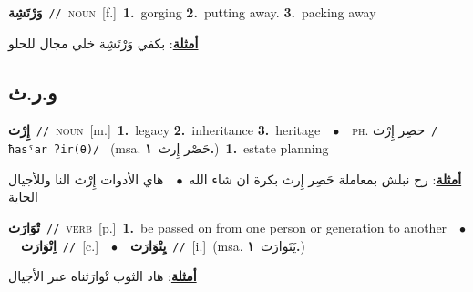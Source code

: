 \documentclass[10pt,a4paper,twoside]{article} %
\begin{document}
\begin{multicols}{2}
{\setlength\topsep{0pt}\textbf{\foreignlanguage{arabic}{وَرْتَشِة}}\ {\color{gray}\texttt{//}\color{black}}\ \textsc{noun}\ [f.]\ \textbf{1.}~gorging  \textbf{2.}~putting away.  \textbf{3.}~packing away\  \begin{flushright}\color{gray}\foreignlanguage{arabic}{\textbf{\underline{\foreignlanguage{arabic}{أمثلة}}}: بكفي وَرْتَشِة خلي مجال للحلو}\end{flushright}\color{black}} \vspace{2mm}

\vspace{-3mm}
\subsection*{\color{blue}\foreignlanguage{arabic}{و.ر.ث}\color{blue}{}} 

{\setlength\topsep{0pt}\textbf{\foreignlanguage{arabic}{إِرْث}}\ {\color{gray}\texttt{//}\color{black}}\ \textsc{noun}\ [m.]\ \textbf{1.}~legacy  \textbf{2.}~inheritance  \textbf{3.}~heritage\ \ $\bullet$\ \ \textsc{ph.} \color{gray} \foreignlanguage{arabic}{حصِر إِرْث}\color{black}\ {\color{gray}\texttt{/{\sffamily ħasˤar ʔir(θ)}/}\color{black}}\ \color{gray} (msa. \foreignlanguage{arabic}{حَصْر إِرث}~\foreignlanguage{arabic}{\textbf{١.}})\color{black}\ \textbf{1.}~estate planning\  \begin{flushright}\color{gray}\foreignlanguage{arabic}{\textbf{\underline{\foreignlanguage{arabic}{أمثلة}}}: رح نبلش بمعاملة حَصِر إِرث بكرة ان شاء الله\ $\bullet$\ \  هاي الأدوات إِرْث النا وللأجيال الجاية}\end{flushright}\color{black}} \vspace{2mm}

{\setlength\topsep{0pt}\textbf{\foreignlanguage{arabic}{تْوَارَث}}\ {\color{gray}\texttt{//}\color{black}}\ \textsc{verb}\ [p.]\ \textbf{1.}~be passed on from one person or generation to another\ \ $\bullet$\ \ \setlength\topsep{0pt}\textbf{\foreignlanguage{arabic}{اِتْوَارَث}}\ {\color{gray}\texttt{//}\color{black}}\ [c.]\ \ $\bullet$\ \ \setlength\topsep{0pt}\textbf{\foreignlanguage{arabic}{يِتْوَارَث}}\ {\color{gray}\texttt{//}\color{black}}\ [i.]\ \color{gray}(msa. \foreignlanguage{arabic}{يَتَوارَث}~\foreignlanguage{arabic}{\textbf{١.}})\color{black}\  \begin{flushright}\color{gray}\foreignlanguage{arabic}{\textbf{\underline{\foreignlanguage{arabic}{أمثلة}}}: هاد الثوب تْوارَثناه عبر الأجيال}\end{flushright}\color{black}} \vspace{2mm}


\end{multicols}
\end{document}
